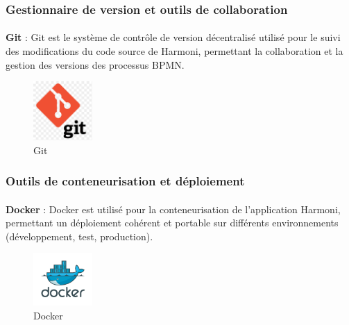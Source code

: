\subsubsection{Gestionnaire de version et outils de collaboration}

\paragraph{}{
\begin{dinglist}{80}
    
    \item \textbf{Git} : Git est le système de contrôle de version décentralisé utilisé pour le suivi des modifications du code source de Harmoni, permettant la collaboration et la gestion des versions des processus BPMN.
    
    \begin{figure}[H]
        \centering
        \includegraphics[width=0.2\textwidth]{Images/git.png}
        \caption{Git}
        \label{fig:git}
    \end{figure}
\end{dinglist}}

\subsubsection{Outils de conteneurisation et déploiement}

\paragraph{}{
\begin{dinglist}{80}
    
    \item \textbf{Docker} : Docker est utilisé pour la conteneurisation de l'application Harmoni, permettant un déploiement cohérent et portable sur différents environnements (développement, test, production).
    
    \begin{figure}[H]
        \centering
        \includegraphics[width=0.2\textwidth]{Images/docker.png}
        \caption{Docker}
        \label{fig:docker}
    \end{figure}
\end{dinglist}}


